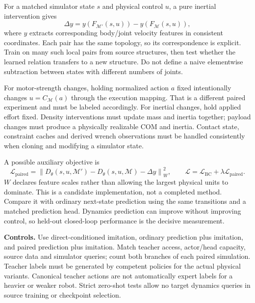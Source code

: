 \documentclass[11pt,letterpaper]{article}
\newcommand{\mech}{\mathcal{M}}
\begin{document}
For a matched simulator state $s$ and physical control $u$, a pure inertial
intervention gives
\begin{equation}
 \Delta y=y\!\left(F_{\mech'}(s,u)\right)
          -y\!\left(F_{\mech}(s,u)\right),
 \label{eq:paired}
\end{equation}
where $y$ extracts corresponding body/joint velocity features in consistent
coordinates. Each pair has the same topology, so its correspondence is explicit.
Train on many such local pairs from source structures, then test whether the
learned relation transfers to a new structure. Do not define a naive elementwise
subtraction between states with different numbers of joints.

For motor-strength changes, holding normalized action $a$ fixed intentionally
changes $u=C_{\mech}(a)$ through the execution mapping. That is a different paired
experiment and must be labeled accordingly. For inertial changes, hold applied
effort fixed. Density interventions must update mass and inertia together;
payload changes must produce a physically realizable COM and inertia. Contact
state, constraint caches and derived wrench observations must be handled
consistently when cloning and modifying a simulator state.

A possible auxiliary objective is
\begin{equation}
 \mathcal L_{\mathrm{paired}}=
 \left\|D_\theta(s,u,\mech')-D_\theta(s,u,\mech)-\Delta y\right\|_W^2,
 \qquad
 \mathcal L=\mathcal L_{\mathrm{BC}}+\lambda\mathcal L_{\mathrm{paired}}.
 \label{eq:pairedloss}
\end{equation}
$W$ declares feature scales rather than allowing the largest physical units to
dominate. This is a candidate implementation, not a completed method. Compare it
with ordinary next-state prediction using the same transitions and a matched
prediction head. Dynamics prediction can improve without improving control, so
held-out closed-loop performance is the decisive measurement.

\textbf{Controls.} Use direct-conditioned imitation, ordinary prediction plus
imitation, and paired prediction plus imitation. Match teacher access, actor/head
capacity, source data and simulator queries; count both branches of each paired
simulation. Teacher labels must be generated by competent policies for the
actual physical variants. Canonical teacher actions are not automatically expert
labels for a heavier or weaker robot. Strict zero-shot tests allow no target
dynamics queries in source training or checkpoint selection.
\end{document}
